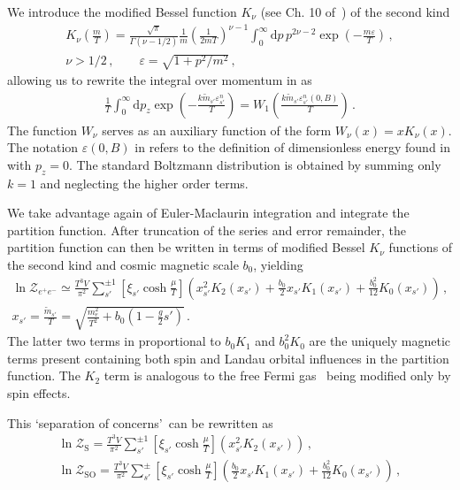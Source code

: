 We introduce the modified Bessel function $K_{\nu}$ (see Ch. 10 of~\cite{Letessier:2002ony}) of the second kind
\begin{gather}
\label{besselk}
K_{\nu}\left(\frac{m}{T}\right)=\frac{\sqrt{\pi}}{\Gamma(\nu-1/2)}\frac{1}{m}\left(\frac{1}{2mT}\right)^{\nu-1}
\int_{0}^{\infty}\mathrm{d}p\,p^{2\nu-2}\exp\left({-\frac{m\varepsilon}{T}}\right)\,,\\
\nu>1/2\,,\qquad\varepsilon=\sqrt{1+p^{2}/m^{2}}\,,
\end{gather}
allowing us to rewrite the integral over momentum in  as
\begin{align}
 \label{besselkint}
 \frac{1}{T}\int_{0}^{\infty}\!\!\mathrm{d}p_{z}\exp\!\left(\!{-\frac{k{\tilde m}_{s'}\varepsilon_{s'}^{n}}{T}}\!\right)\!=\!W_{1}\!\!\left(\frac{k{\tilde m}_{s'}\varepsilon_{s'}^{n}(0,{B})}{T}\right)\,.
\end{align}
The function $W_{\nu}$ serves as an auxiliary function of the form $W_{\nu}(x)=xK_{\nu}(x)$. The notation $\varepsilon(0,{B})$ in  refers to the definition of dimensionless energy found in  with $p_{z}=0$. The standard Boltzmann distribution is obtained by summing only $k=1$ and neglecting the higher order terms.

We take advantage again of Euler-Maclaurin integration  and integrate the partition function. After truncation of the series and error remainder, the partition function  can then be written in terms of modified Bessel $K_{\nu}$ functions of the second kind and cosmic magnetic scale $b_{0}$, yielding
\begin{gather}
        \label{boltzmann}
        \ln\mathcal{Z}_{e^{+}e^{-}}\simeq\frac{T^{3}V}{\pi^{2}}\sum_{s'}^{\pm1}\left[\xi_{s'}\cosh{\frac{\mu}{T}}\right]
        \left(x_{s'}^{2}K_{2}(x_{s'})+\frac{b_{0}}{2}x_{s'}K_{1}(x_{s'})+\frac{b_{0}^{2}}{12}K_{0}(x_{s'})\right)\,,\\
    \label{xfunc}
    x_{s'}=\frac{{\tilde m}_{s'}}{T}=\sqrt{\frac{m_{e}^{2}}{T^{2}}+b_{0}\left(1-\frac{g}{2}s'\right)}\,.
\end{gather}
The latter two terms in  proportional to $b_{0}K_{1}$ and $b_{0}^{2}K_{0}$ are the uniquely magnetic terms present containing both spin and Landau orbital influences in the partition function. The $K_{2}$ term is analogous to the free Fermi gas~\citep{greiner2012thermodynamics} being modified only by spin effects.

This \lq separation of concerns\rq\ can be rewritten as
\begin{gather}
    \label{spin}
    \ln\mathcal{Z}_\mathrm{S}=\frac{T^{3}V}{\pi^{2}}\sum_{s'}^{\pm1}\left[\xi_{s'}\cosh{\frac{\mu}{T}}\right]\left(x_{s'}^{2}K_{2}(x_{s'})\right)\,,\\
    \label{spinorbit}
    \ln\mathcal{Z}_\mathrm{SO}=\frac{T^{3}V}{\pi^{2}}\sum_{s'}^{\pm}\left[\xi_{s'}\cosh{\frac{\mu}{T}}\right]
    \left(\frac{b_{0}}{2}x_{s'}K_{1}(x_{s'})+\frac{b_{0}^{2}}{12}K_{0}(x_{s'})\right)\,,        
\end{gather}

